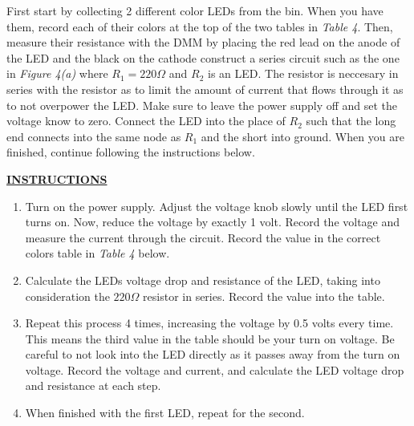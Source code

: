 \documentclass[12pt]{article}
\begin{document}
First start by collecting 2 different color LEDs from the bin. When you have them, record each of their colors at the top of the two tables in \textit{Table 4}. Then, measure their resistance with the DMM by placing the red lead on the anode of the LED and the black on the cathode construct a series circuit such as the one in \textit{Figure 4(a)} where $R_{1} = 220\Omega$ and $R_{2}$ is an LED. The resistor is neccesary in series with the resistor as to limit the amount of current that flows through it as to not overpower the LED. Make sure to leave the power supply off and set the voltage know to zero. Connect the LED into the place of $R_{2}$ such that the long end connects into the same node as $R_{1}$ and the short into ground. When you are finished, continue following the instructions below.

\textbf{\underline{INSTRUCTIONS}}

\begin{enumerate}
    \item Turn on the power supply. Adjust the voltage knob slowly until the LED first turns on. Now, reduce the voltage by exactly 1 volt. Record the voltage and measure the current through the circuit. Record the value in the correct colors table in \textit{Table 4} below.
    \item Calculate the LEDs voltage drop and resistance of the LED, taking into consideration the $220\Omega$ resistor in series. Record the value into the table.
    \item Repeat this process 4 times, increasing the voltage by 0.5 volts every time. This means the third value in the table should be your turn on voltage. Be careful to not look into the LED directly as it passes away from the turn on voltage. Record the voltage and current, and calculate the LED voltage drop and resistance at each step.
    \item When finished with the first LED, repeat for the second.
\end{enumerate}
\end{document}
